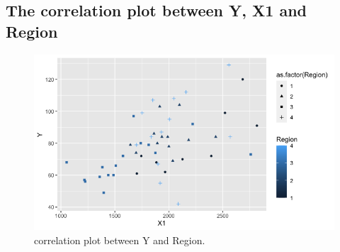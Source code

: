 \documentclass[12pt,letterpaper]{article}
\begin{document}
\subsection*{The correlation plot between Y, X1 and Region}


  


\begin{figure}[h!]\centering
	\caption{\footnotesize correlation plot  between Y and Region.}
	\label{fig:plot_1}
	\includegraphics[width=.75\textwidth]{Correlation Y X1 & Region.png}
\end{figure}
\end{document}
